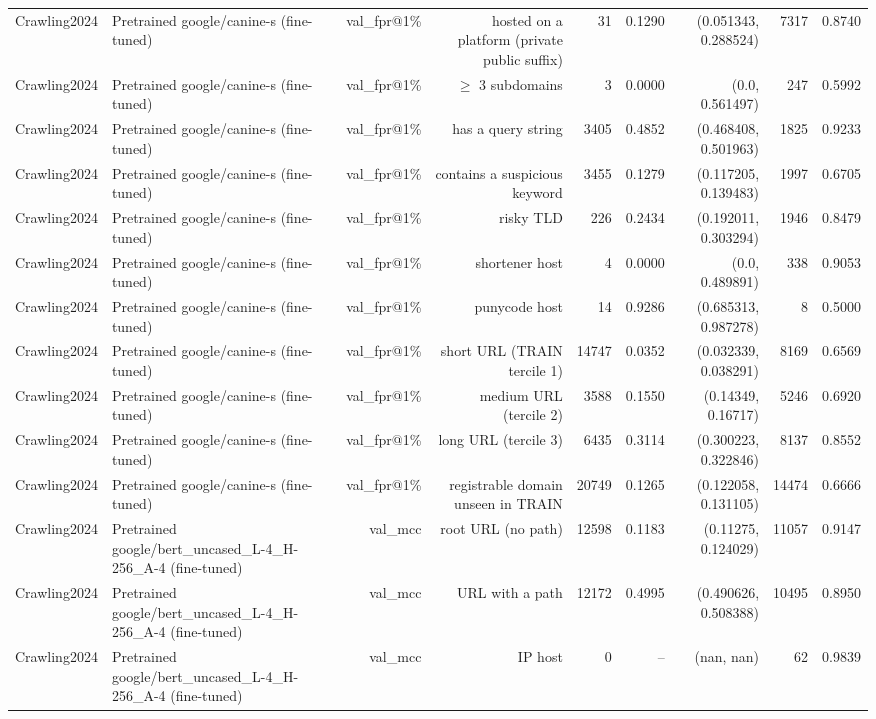 \begin{table}[t]
\begin{tabular}{llrrrrrrr}
Crawling2024 & Pretrained google/canine-s (fine-tuned) & val\_fpr@1\% & hosted on a platform (private public suffix) & 31 & 0.1290 & (0.051343, 0.288524) & 7317 & 0.8740 \\
Crawling2024 & Pretrained google/canine-s (fine-tuned) & val\_fpr@1\% & $\geq$ 3 subdomains & 3 & 0.0000 & (0.0, 0.561497) & 247 & 0.5992 \\
Crawling2024 & Pretrained google/canine-s (fine-tuned) & val\_fpr@1\% & has a query string & 3405 & 0.4852 & (0.468408, 0.501963) & 1825 & 0.9233 \\
Crawling2024 & Pretrained google/canine-s (fine-tuned) & val\_fpr@1\% & contains a suspicious keyword & 3455 & 0.1279 & (0.117205, 0.139483) & 1997 & 0.6705 \\
Crawling2024 & Pretrained google/canine-s (fine-tuned) & val\_fpr@1\% & risky TLD & 226 & 0.2434 & (0.192011, 0.303294) & 1946 & 0.8479 \\
Crawling2024 & Pretrained google/canine-s (fine-tuned) & val\_fpr@1\% & shortener host & 4 & 0.0000 & (0.0, 0.489891) & 338 & 0.9053 \\
Crawling2024 & Pretrained google/canine-s (fine-tuned) & val\_fpr@1\% & punycode host & 14 & 0.9286 & (0.685313, 0.987278) & 8 & 0.5000 \\
Crawling2024 & Pretrained google/canine-s (fine-tuned) & val\_fpr@1\% & short URL (TRAIN tercile 1) & 14747 & 0.0352 & (0.032339, 0.038291) & 8169 & 0.6569 \\
Crawling2024 & Pretrained google/canine-s (fine-tuned) & val\_fpr@1\% & medium URL (tercile 2) & 3588 & 0.1550 & (0.14349, 0.16717) & 5246 & 0.6920 \\
Crawling2024 & Pretrained google/canine-s (fine-tuned) & val\_fpr@1\% & long URL (tercile 3) & 6435 & 0.3114 & (0.300223, 0.322846) & 8137 & 0.8552 \\
Crawling2024 & Pretrained google/canine-s (fine-tuned) & val\_fpr@1\% & registrable domain unseen in TRAIN & 20749 & 0.1265 & (0.122058, 0.131105) & 14474 & 0.6666 \\
Crawling2024 & Pretrained google/bert\_uncased\_L-4\_H-256\_A-4 (fine-tuned) & val\_mcc & root URL (no path) & 12598 & 0.1183 & (0.11275, 0.124029) & 11057 & 0.9147 \\
Crawling2024 & Pretrained google/bert\_uncased\_L-4\_H-256\_A-4 (fine-tuned) & val\_mcc & URL with a path & 12172 & 0.4995 & (0.490626, 0.508388) & 10495 & 0.8950 \\
Crawling2024 & Pretrained google/bert\_uncased\_L-4\_H-256\_A-4 (fine-tuned) & val\_mcc & IP host & 0 & -- & (nan, nan) & 62 & 0.9839 \\

\end{tabular}
\end{table}
